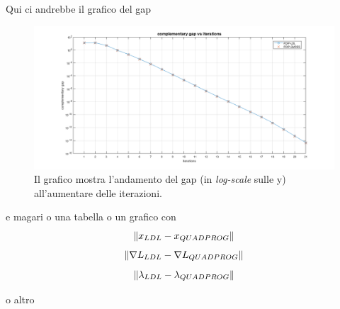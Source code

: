 Qui ci andrebbe il grafico del gap 

\begin{figure}[h]
    \centering
    \includegraphics[width=\textwidth]{img/MU6.png}
    \caption{Il grafico mostra l'andamento del gap (in \textit{log-scale} sulle y) all'aumentare delle iterazioni. \label{fig:gap}}
\end{figure}

e magari o una tabella o un grafico con
$$ \left\lVert x_{LDL} - x_{QUADPROG}\right\rVert $$
$$ \left\lVert\nabla L_{LDL} - \nabla L_{QUADPROG}\right\rVert $$
$$ \left\lVert\lambda_{LDL} - \lambda_{QUADPROG}\right\rVert $$

o altro